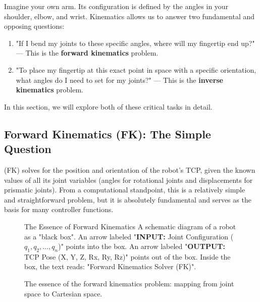 Imagine your own arm. Its configuration is defined by the angles in your shoulder, elbow, and wrist. Kinematics allows us to answer two fundamental and opposing questions:

\begin{enumerate}
    \item "If I bend my joints to these specific angles, where will my fingertip end up?" — This is the \textbf{forward kinematics} problem.
    \item "To place my fingertip at this exact point in space with a specific orientation, what angles do I need to set for my joints?" — This is the \textbf{inverse kinematics} problem.
\end{enumerate}

In this section, we will explore both of these critical tasks in detail.

\subsection{Forward Kinematics (FK): The Simple Question}

 (FK) solves for the position and orientation of the robot's TCP, given the known values of all its joint variables (angles for rotational joints and displacements for prismatic joints). From a computational standpoint, this is a relatively simple and straightforward problem, but it is absolutely fundamental and serves as the basis for many controller functions.

\begin{figure}[h!]
    \centering
    \begin{infobox}{The Essence of Forward Kinematics}
        A schematic diagram of a robot as a "black box".
        An arrow labeled "\textbf{INPUT:} Joint Configuration ($q_1, q_2, \dots, q_n$)" points into the box.
        An arrow labeled "\textbf{OUTPUT:} TCP Pose (X, Y, Z, Rx, Ry, Rz)" points out of the box.
        Inside the box, the text reads: "Forward Kinematics Solver (FK)".
    \end{infobox}
    \caption{The essence of the forward kinematics problem: mapping from joint space to Cartesian space.}
    \label{fig:fk_essence}
\end{figure}


